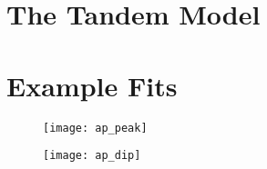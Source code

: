 \appendix
\section{The Tandem Model}\label{sec:apdx_A}




\newpage

\section{Example Fits}
 \begin{figure}[H]
     \centering
     \texttt{[image: ap\_peak]}
     \caption{}
     \label{}
 \end{figure}

 \begin{figure}[H]
     \centering
     \texttt{[image: ap\_dip]}
     \caption{}
     \label{}
 \end{figure}